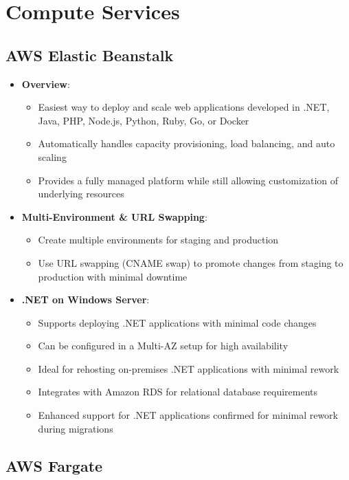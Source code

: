 \documentclass[11pt,a4paper]{report}
\begin{document}
\chapter{Compute Services}



\section{AWS Elastic Beanstalk}

\begin{itemize}
  \item \textbf{Overview}:
\begin{itemize}
  \item Easiest way to deploy and scale web applications developed in .NET, Java, PHP, Node.js, Python, Ruby, Go, or Docker
  \item Automatically handles capacity provisioning, load balancing, and auto scaling
  \item Provides a fully managed platform while still allowing customization of underlying resources
\end{itemize}
  \item \textbf{Multi-Environment \& URL Swapping}:
\begin{itemize}
  \item Create multiple environments for staging and production
  \item Use URL swapping (CNAME swap) to promote changes from staging to production with minimal downtime
\end{itemize}
  \item \textbf{.NET on Windows Server}:
\begin{itemize}
  \item Supports deploying .NET applications with minimal code changes
  \item Can be configured in a Multi-AZ setup for high availability
  \item Ideal for rehosting on-premises .NET applications with minimal rework
  \item Integrates with Amazon RDS for relational database requirements
  \item Enhanced support for .NET applications confirmed for minimal rework during migrations
\end{itemize}
\end{itemize}


\section{AWS Fargate}
\end{document}
